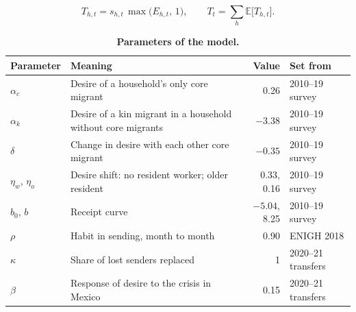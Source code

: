\begin{equation}
T_{h,t} = s_{h,t}\,\max\big(E_{h,t},\, 1\big), \qquad T_t = \sum_h \mathbb{E}\big[T_{h,t}\big].
\end{equation}

\begin{table}[ht]
\centering
\caption{\textbf{Parameters of the model.}}
\label{tab:params}
\begin{tabularx}{\linewidth}{lXrl}
\toprule
Parameter & Meaning & Value & Set from \\
\midrule
$\alpha_c$ & Desire of a household's only core migrant & 0.26 & 2010--19 survey \\
$\alpha_k$ & Desire of a kin migrant in a household without core migrants & $-3.38$ & 2010--19 survey \\
$\delta$ & Change in desire with each other core migrant & $-0.35$ & 2010--19 survey \\
$\eta_w$, $\eta_o$ & Desire shift: no resident worker; older resident & 0.33, 0.16 & 2010--19 survey \\
$b_0$, $b$ & Receipt curve & $-5.04$, 8.25 & 2010--19 survey \\
\midrule
$\rho$ & Habit in sending, month to month & 0.90 & ENIGH 2018 \\  %
\midrule
$\kappa$ & Share of lost senders replaced & 1 & 2020--21 transfers \\
$\beta$ & Response of desire to the crisis in Mexico & 0.15 & 2020--21 transfers \\
\bottomrule
\end{tabularx}
\end{table}
